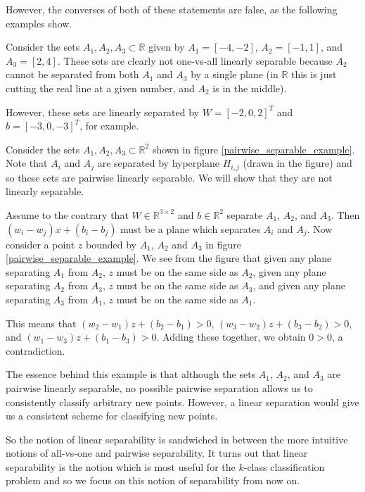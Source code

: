 However, the converses of both of these statements are false, as the following examples show.
\begin{example}
 Consider the sets $A_1, A_2, A_3\subset \mathbb{R}$ given by $A_1 = [-4,-2]$, $A_2 = [-1,1]$, and $A_3 = [2,4]$. These
 sets are clearly not one-vs-all linearly separable because $A_2$ cannot be separated from both $A_1$ and $A_3$ by a single
 plane (in $\mathbb{R}$ this is just cutting the real line at a given number, and $A_2$ is in the middle).
 
 However, these sets are linearly separated by $W = [-2,0,2]^T$ and $b = [-3,0,-3]^T$, for example.
\end{example}
\begin{example}
Consider the sets $A_1, A_2, A_3\subset \mathbb{R}^2$ shown in figure \ref{pairwise_separable_example}.
Note that $A_i$ and $A_j$ are separated by hyperplane $H_{i,j}$ (drawn in the figure) and so these sets are
pairwise linearly separable. We will show that they are not linearly separable.

Assume to the contrary that $W\in \mathbb{R}^{3\times 2}$ and $b\in \mathbb{R}^2$ separate $A_1$, $A_2$, and $A_3$. Then
$(w_i - w_j)x + (b_i - b_j)$ must be a plane which separates $A_i$ and $A_j$. Now consider a point $z$ bounded by $A_1$, $A_2$ and $A_3$ in figure 
\ref{pairwise_separable_example}. We see from the figure that given any plane separating $A_1$ from $A_2$, $z$ must
be on the same side as $A_2$, given any plane separating $A_2$ from $A_3$, $z$ must be on the same side as
$A_3$, and given any plane separating $A_3$ from $A_1$, $z$ must be on the same side as $A_1$.

This means that $(w_2 - w_1)z + (b_2 - b_1) > 0$, $(w_3 - w_2)z + (b_3 - b_2) > 0$, and
$(w_1 - w_3)z + (b_1 - b_3) > 0$. Adding these together, we obtain $0 > 0$, a contradiction.

The essence behind this example is that although the sets $A_1$, $A_2$, and $A_3$ are pairwise linearly separable, 
no possible pairwise separation allows us to consistently classify arbitrary new points. However, a linear separation
would give us a consistent scheme for classifying new points.

\end{example}

So the notion of linear separability is sandwiched in between the more
intuitive notions of all-vs-one and pairwise separability. It turns
out that linear separability is the notion which is most useful for
the $k$-class classification problem and so we focus on this notion of
separability from now on.




